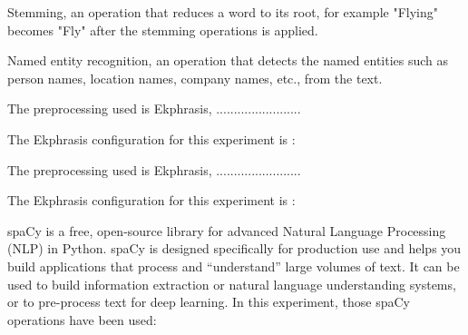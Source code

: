 \documentclass[12pt, a4paper]{article}
\begin{document}
Stemming, an operation that reduces a word to its root, for example "Flying" becomes "Fly" after the stemming operations is applied.


Named entity recognition, an operation that detects the named entities such as person names, location names, company names, etc., from the text.
\hfill\break

\hfill\break






The preprocessing used is Ekphrasis, ........................

\hfill\break
The Ekphrasis configuration for this experiment is :



The preprocessing used is Ekphrasis, ........................

\hfill\break
The Ekphrasis configuration for this experiment is :




spaCy is a free, open-source library for advanced Natural Language Processing (NLP) in Python.
spaCy is designed specifically for production use and helps you build applications that process and “understand”
large volumes of text. It can be used to build information extraction or natural language understanding systems,
or to pre-process text for deep learning.
In this experiment, those spaCy operations have been used:
\end{document}
